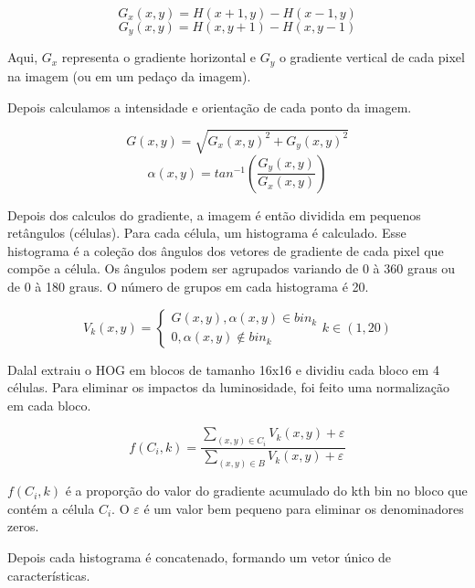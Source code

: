 \[G_{x}(x,y) = H(x+1, y) - H(x-1, y)\]
\[G_{y}(x,y) = H(x, y+1) - H(x, y-1)\]

Aqui, \(G_{x}\) representa o gradiente horizontal e \(G_{y}\) o gradiente vertical de cada pixel na imagem (ou em um pedaço da imagem).

Depois calculamos a intensidade e orientação de cada ponto da imagem.

\[G(x,y) = \sqrt{G_{x}(x,y)^{2} + G_{y}(x,y)^{2}}\]
\[\alpha (x,y) = tan^{-1} \left(\frac{G_{y}(x,y)}{G_{x}(x,y)}\right)\]

Depois dos calculos do gradiente, a imagem é então dividida em pequenos retângulos (células). Para cada célula, um histograma é calculado. Esse histograma é a coleção dos ângulos dos vetores de gradiente de cada pixel que compõe a célula. Os ângulos podem ser agrupados variando de 0 à 360 graus ou de 0 à 180 graus. O número de grupos em cada histograma é 20.

\[
V_{k}(x,y) = \left\{\begin{matrix}
G(x,y), \alpha (x,y)  \in bin_{k}\\ 
0, \alpha (x,y) \notin bin_{k}
\end{matrix}\right. k \in (1,20)
\]

Dalal extraiu o HOG em blocos de tamanho 16x16 e dividiu cada bloco em 4 células. Para eliminar os impactos da luminosidade, foi feito uma normalização em cada bloco.

\[
f(C_{i},k) = \frac
{\sum_{(x,y) \in C_i}V_k(x,y) + \varepsilon}
{\sum_{(x,y) \in B}V_k(x,y) + \varepsilon}
\]

\(f(C_i,k)\) é a proporção do valor do gradiente acumulado do kth bin no bloco que contém a célula \(C_i\). O \(\varepsilon\) é um valor bem pequeno para eliminar os denominadores zeros.

Depois cada histograma é concatenado, formando um vetor único de características.

%



